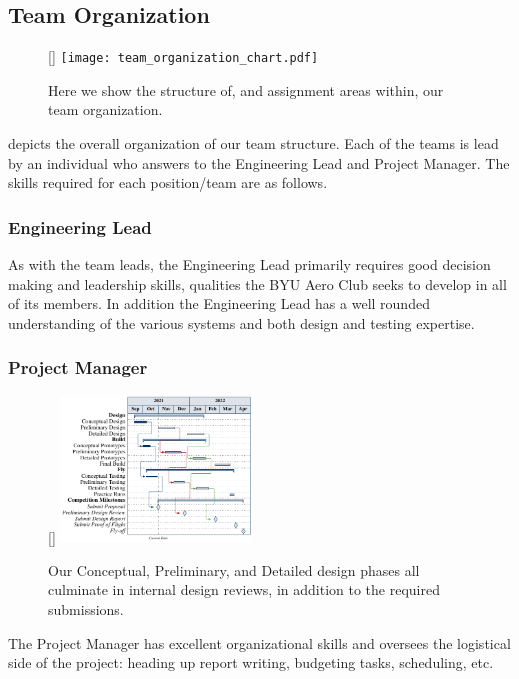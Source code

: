 \subsection{Team Organization}
\label{ssec:TeamOrganization}

\begin{figure}
	\centering
	\raisebox{0pt}[\dimexpr{}\baselineskip\relax]{
		\texttt{[image: team\_organization\_chart.pdf]}}
	\caption{Here we show the structure of, and assignment areas within, our team organization.}
	\label{fig:personnelassignments}
\end{figure}


 depicts the overall organization of our team structure.  Each of the teams is lead by an individual who answers to the Engineering Lead and Project Manager.  The skills required for each position/team are as follows.




\subsubsection{Engineering Lead} As with the team leads, the Engineering Lead primarily requires good decision making and leadership skills, qualities the BYU Aero Club seeks to develop in all of its members.
In addition the Engineering Lead has a well rounded understanding of the various systems and both design and testing expertise.


\subsubsection{Project Manager}\begin{figure}
		\raisebox{0pt}[\dimexpr{}\baselineskip\relax]{
	\includegraphics[width=0.45\textwidth]{ganttchart.pdf}}
	\caption{Our {\color{\BYUblue} Conceptual}, {\color{\BYUred} Preliminary}, and {\color{\BYUgreen} Detailed} design phases all culminate in internal design reviews, in addition to the required submissions.}
	\label{fig:plannedtiming}
\end{figure} The Project Manager has excellent organizational skills
and oversees the logistical side of the project: heading up report writing, budgeting tasks, scheduling, etc.
